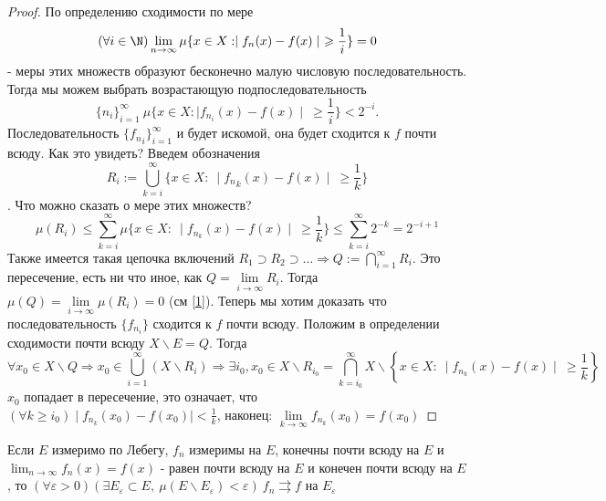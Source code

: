 \begin{proof}
По определению сходимости по мере $$(\forall i \in \N) \lim_{n\to\infty} \mu \{ x\in X: \mid f_n(x)-f(x)\mid \ \geqslant \frac{1}{i} \} =0$$ - меры этих множеств образуют бесконечно малую числовую последовательность. Тогда мы можем выбрать возрастающую подпоследовательность $$\{n_i\}^\infty_{i=1}\  \mu \{ x\in X: \mid f_{n_i}(x)-f(x)\mid \ \geqslant \frac{1}{i} \} < 2^{-i}.$$
Последовательность $\{{f_n}_i\}^\infty_{i=1}$ и будет искомой, она будет сходится к $f$ почти всюду. Как это увидеть? Введем обозначения $$R_i:= \bigcup ^\infty_{k=i} \{x\in X:\ \mid {f_n}_k(x)-f(x)\mid \ \geqslant \frac{1}{k}\}$$. Что можно сказать о мере этих множеств?
\begin{equation}\label{1}
    \mu (R_i) \leqslant \sum_{k=i}^{\infty} \mu \{x\in X:\ \mid f_{n_k}(x)-f(x)\mid \ \geqslant \frac{1}{k}\} \leqslant \sum_{k=i}^{\infty} 2^{-k}=2^{-i+1}
\end{equation}
Также имеется такая цепочка включений $R_1\supset R_2 \supset \ldots \Rightarrow Q:=\bigcap\limits_{i=1}^\infty R_i$. Это пересечение, есть ни что иное, как $Q=\lim\limits_{i\to\infty}R_i$. Тогда $\mu(Q)=\lim\limits_{i\to\infty} \mu(R_i)=0$ (см \ref{1}).
\newpage Теперь мы хотим доказать что последовательность $\{f_{n_i}\}$ сходится к $f$ почти всюду. Положим в определении сходимости почти всюду $X\backslash E = Q$.
Тогда $$\forall x_0 \in X\backslash Q \Rightarrow x_0 \in \bigcup^\infty_{i=1}(X\backslash R_i) \Rightarrow \exists i_0, x_0 \in X\backslash R_{i_0} = \bigcap^\infty_{k=i_0} X\backslash \left\{x\in X:\ \mid f_{n_k}(x)-f(x)\mid \ \geqslant \frac{1}{k}\right\}$$
$x_0$ попадает в пересечение, это означает, что $(\forall k \geqslant i_0) \mid f_{n_k}(x_0)-f(x_0)\mid < \frac{1}{k}$, наконец: ${\lim\limits_{k\to\infty}f_{n_k}(x_0)=f(x_0)}$
\end{proof}
\begin{theorem}[Д. Ф. Егоров]
    Если $E$ измеримо по Лебегу, $f_n$ измеримы на $E$, конечны почти всюду на $E$ и $\lim_{n\to\infty} f_n(x)=f(x)$ - равен почти всюду на $E$ и конечен почти всюду на $E$, то ${(\forall \varepsilon >0)(\exists E_{\varepsilon}\subset E,\ \mu (E\backslash E_{\varepsilon})<\varepsilon)\ f_n \rightrightarrows f}$ на $E_{\varepsilon}$
\end{theorem}
